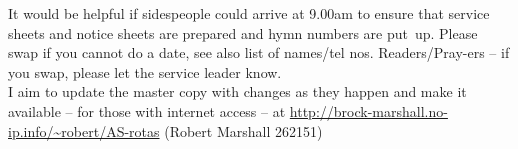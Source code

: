 \documentclass[10pt]{article}
\begin{document}
\begin{center}
\vspace{1em}
\end{center}
\begin{minipage}{0.65\textwidth}
{\footnotesize It would be helpful if sidespeople 
could arrive at 9.00am to ensure that service sheets and notice sheets are 
prepared and hymn numbers are put~up.
Please swap if you cannot do a date, see also list of names/tel nos.
Readers/Pray-ers -- if you swap, please let the service leader know.\\
I aim to update the master copy with changes as they
happen and make it available -- for those with internet access
\linebreak -- at
\url{http://brock-marshall.no-ip.info/~robert/AS-rotas}
(Robert Marshall 262151)}
\end{minipage}
\end{document}
